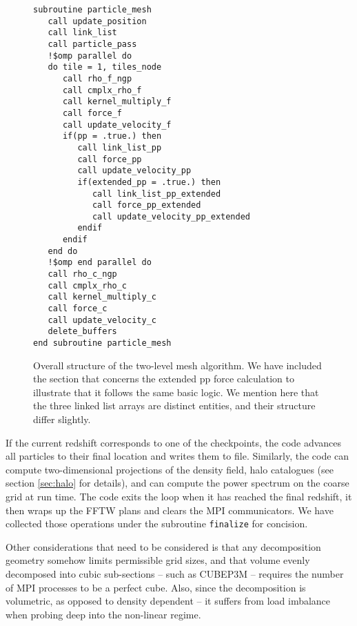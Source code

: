 \begin{figure}
\begin{verbatim}
subroutine particle_mesh
   call update_position
   call link_list
   call particle_pass
   !$omp parallel do
   do tile = 1, tiles_node
      call rho_f_ngp
      call cmplx_rho_f
      call kernel_multiply_f
      call force_f
      call update_velocity_f
      if(pp = .true.) then       
         call link_list_pp
         call force_pp
         call update_velocity_pp
         if(extended_pp = .true.) then
            call link_list_pp_extended
            call force_pp_extended
            call update_velocity_pp_extended       
         endif
      endif
   end do
   !$omp end parallel do
   call rho_c_ngp
   call cmplx_rho_c
   call kernel_multiply_c
   call force_c
   call update_velocity_c      
   delete_buffers
end subroutine particle_mesh
\end{verbatim}
\caption{Overall structure of the two-level mesh algorithm. We have included the section that concerns the extended pp force calculation to illustrate that it follows the same basic logic. We mention here that the three linked list arrays are distinct entities, and their structure differ slightly.  }
\label{fig:particle_mesh}
\end{figure}


If the current redshift corresponds to one of the checkpoints, the code advances all particles to their final location
and writes them to file. Similarly, the code can compute two-dimensional projections of the density field, halo catalogues (see section \ref{sec:halo} for details), and can compute the power spectrum on the coarse grid at run time. 
The code exits the loop when it has reached the final redshift, it then wraps up the {\small FFTW} plans 
and clears the {\small MPI} communicators. We have collected those operations under the subroutine {\tt finalize} for concision.

Other considerations that need to be considered is that any decomposition geometry somehow 
limits permissible grid sizes, and that volume evenly decomposed into cubic sub-sections 
--  such as {\small CUBEP3M} -- requires the number of MPI processes to be a perfect cube.
Also,  since the decomposition is volumetric, as opposed to density dependent -- 
it suffers from load imbalance when probing deep into the non-linear regime.
